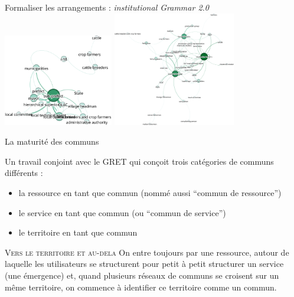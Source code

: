 \documentclass[newPxFont]{beamer}
\begin{document}
\begin{frame}[c]{Formaliser les arrangements : \textit{institutional Grammar 2.0}}
    \vspace{-1cm}
    \includegraphics[height=4cm]{img/sg_agent_Admin.png}
    \includegraphics[height=5cm]{img/sg_popLozc.png}
\end{frame}

\begin{frame}[c]{La maturité des communs}
      \vspace{-1cm}

    Un travail conjoint avec le GRET qui conçoit trois catégories de communs différents :
      \begin{itemize}
          \item la ressource en tant que commun (nommé aussi “commun de ressource”)
          \item le service en tant que commun (ou “commun de service”)
          \item le territoire en tant que commun
      \end{itemize}

       \small{
         \begin{alertblock}{\textsc{Vers le territoire et au-dela}}
           On entre toujours par une ressource, autour de laquelle les utilisateurs se structurent pour petit à petit structurer un service (une émergence) et, quand plusieurs réseaux de communs se croisent sur un même territoire, on commence à identifier ce territoire comme un commun.
         \end{alertblock}
       }
\end{frame}
\end{document}
